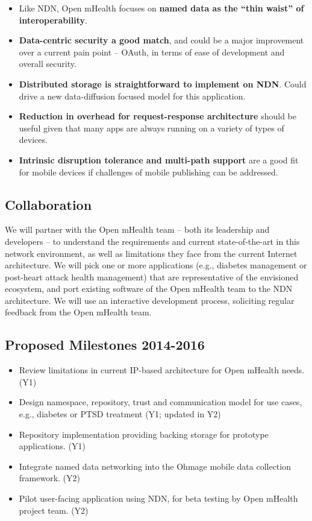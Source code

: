 \begin{itemize}
\item Like NDN, Open mHealth  focuses on \textbf{named data as the ``thin waist'' of interoperability}. 
\item \textbf{Data-centric security a good match}, and could be a major improvement over a current pain point – OAuth, in terms of ease of development and overall security.
\item \textbf{Distributed storage is straightforward to implement on NDN}. Could drive a new data-diffusion focused model for this application. 
\item \textbf{Reduction in overhead for request-response architecture} should be useful given that many apps are always running on a variety of types of devices. 
\item \textbf{Intrinsic disruption tolerance and multi-path support} are a good fit for mobile devices if challenges of mobile publishing can be addressed. 
\end{itemize}

\subsection{Collaboration}

We will partner with the Open mHealth team -- both its leadership and
developers -- to understand the requirements and current state-of-the-art
in this network environment, as well as limitations they face from the
current Internet architecture. We will pick one or more 
applications (e.g., diabetes management or post-heart attack health management) 
that are representative of the envisioned ecosystem, and port existing software
of the Open mHealth team to the NDN architecture.  We will use an interactive
development process, soliciting regular feedback from the Open mHealth team.   

\subsection{Proposed Milestones 2014-2016}

\begin{itemize}
\item Review limitations in current IP-based architecture for Open mHealth needs. (Y1)
\item Design namespace, repository, trust and communication model for use cases, e.g., diabetes or PTSD treatment (Y1; updated in Y2)
\item Repository implementation providing backing storage for prototype applications. (Y1)
\item Integrate named data networking into the Ohmage mobile data collection framework. (Y2)
\item Pilot user-facing application using NDN, for beta testing by Open mHealth project team. (Y2)
\end{itemize}






